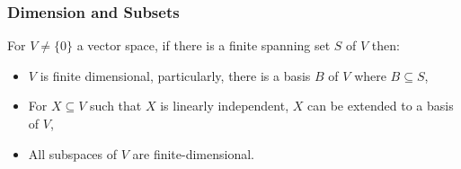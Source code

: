 \subsubsection{Dimension and Subsets}

For $V \neq \{0\}$ a vector space, if there is a
finite spanning set $S$ of $V$ then: \begin{itemize}
  \item $V$ is finite dimensional, particularly, there is a basis $B$ of $V$
  where $B \subseteq S$,
  \item For $X \subseteq V$ such that $X$ is linearly independent, $X$ can
  be extended to a basis of $V$,
  \item All subspaces of $V$ are finite-dimensional.
\end{itemize}